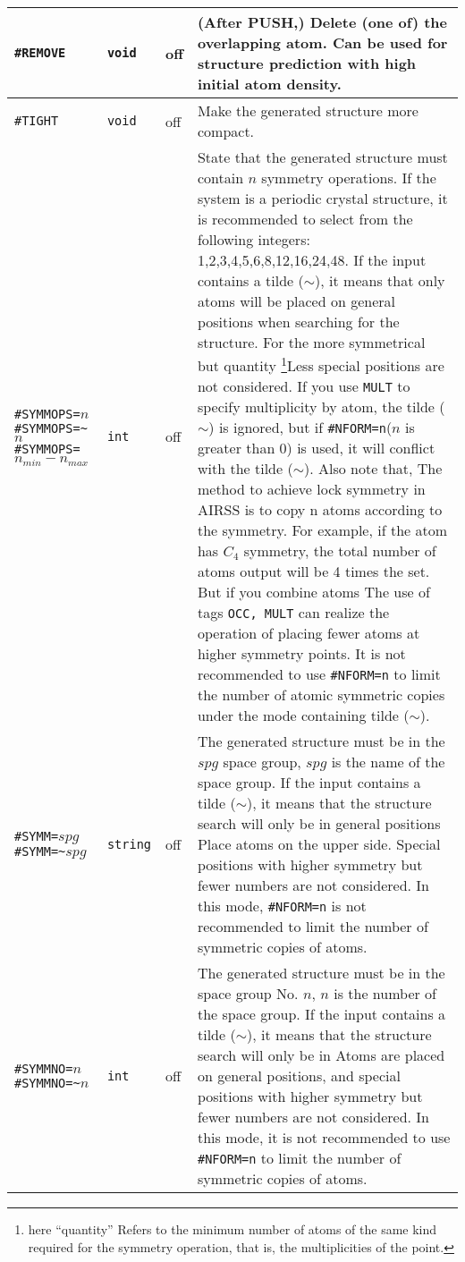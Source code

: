 \documentclass[a4paper, 10pt]{article}
\begin{document}
\begin{center}
\begin{longtable}{m{11em}|m{4em}<{\centering}|m{3em}<{\centering}|m{15em}}
\midrule
\verb|#REMOVE|& \verb|void| & off & (After PUSH,) Delete (one of) the overlapping atom. Can be used for structure prediction with high initial atom density.\\
\midrule
\verb|#TIGHT|& \verb|void| & off & Make the generated structure more compact.\\
\midrule
\verb|#SYMMOPS=|\(n\)\hspace{6em}\verb|#SYMMOPS=~|\(n\;\;\;\;\;\;\;\;\;\;\;\)\hspace{6em}\verb|#SYMMOPS=|\(n_{min}-n_{max}\) & \verb|int| &  off & State that the generated structure must contain \(n\) symmetry operations. If the system is a periodic crystal structure, it is recommended to select from the following integers: 1,2,3,4,5,6,8,12,16,24,48. If the input contains a tilde (\(\sim\)), it means that only atoms will be placed on general positions when searching for the structure. For the more symmetrical but quantity \footnote{here ``quantity'' Refers to the minimum number of atoms of the same kind required for the symmetry operation, that is, the multiplicities of the point. }Less special positions are not considered. If you use \verb|MULT| to specify multiplicity by atom, the tilde (\(\sim\)) is ignored, but if \verb|#NFORM=n|(\(n\) is greater than 0) is used, it will conflict with the tilde (\(\sim\)). Also note that, The method to achieve lock symmetry in AIRSS is to copy n atoms according to the symmetry. For example, if the atom has \(C_4\) symmetry, the total number of atoms output will be 4 times the set. But if you combine atoms The use of tags \verb|OCC, MULT| can realize the operation of placing fewer atoms at higher symmetry points. It is not recommended to use \verb|#NFORM=n|  to limit the number of atomic symmetric copies under the mode containing tilde (\(\sim\)).\\
\midrule
\verb|#SYMM=|\(spg\)\hspace{6em} \verb|#SYMM=~|\(spg\)& \verb|string| & off & The generated structure must be in the \(spg\) space group, \(spg\) is the name of the space group. If the input contains a tilde (\(\sim\)), it means that the structure search will only be in general positions Place atoms on the upper side. Special positions with higher symmetry but fewer numbers are not considered. In this mode, \verb|#NFORM=n| is not recommended to limit the number of symmetric copies of atoms.\\
\midrule
\verb|#SYMMNO=|\(n\)\hspace{6em} \verb|#SYMMNO=~|\(n\) & \verb|int| & off & The generated structure must be in the space group No. \(n\), \(n\) is the number of the space group. If the input contains a tilde (\(\sim\)), it means that the structure search will only be in Atoms are placed on general positions, and special positions with higher symmetry but fewer numbers are not considered. In this mode, it is not recommended to use \verb|#NFORM=n| to limit the number of symmetric copies of atoms.\\

\end{longtable}
\end{center}
\end{document}
